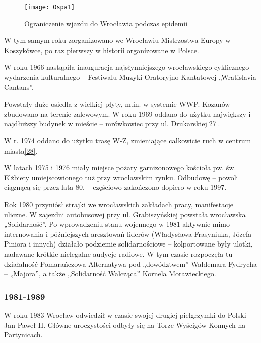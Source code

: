 \documentclass{article}
\begin{document}
\begin{figure}[h]
\centering

\texttt{[image: Ospa1]}
\caption{Ograniczenie wjazdu do Wrocławia podczas epidemii}
\label{rysunek18}
\end{figure}


\noindent W tym samym roku zorganizowano we Wrocławiu Mistrzostwa Europy w Koszykówce, po raz pierwszy w historii organizowane w Polsce.

\vspace{6pt}

\noindent W roku 1966 nastąpiła inauguracja najsłynniejszego wrocławskiego cyklicznego wydarzenia kulturalnego – Festiwalu Muzyki Oratoryjno-Kantatowej „Wratislavia Cantans”.

\vspace{6pt}

\noindent Powstały duże osiedla z wielkiej płyty, m.in. w systemie WWP. Kozanów zbudowano na terenie zalewowym. W roku 1969 oddano do użytku największy i najdłuższy budynek w mieście – mrówkowiec przy ul. Drukarskiej\hyperref[27]{[27]}\label{227}.

\vspace{6pt}

\noindent W r. 1974 oddano do użytku trasę W-Z, zmieniające całkowicie ruch w centrum miasta\hyperref[28]{[28]}\label{228}.

\vspace{6pt}

\noindent W latach 1975 i 1976 miały miejsce pożary garnizonowego kościoła pw. św. Elżbiety umiejscowionego tuż przy wrocławskim rynku. Odbudowę – powoli ciągnącą się przez lata 80. – częściowo zakończono dopiero w roku 1997.

\vspace{6pt}

\noindent Rok 1980 przyniósł strajki we wrocławskich zakładach pracy, manifestacje uliczne. W zajezdni autobusowej przy ul. Grabiszyńskiej powstała wrocławska „Solidarność”. Po wprowadzeniu stanu wojennego w 1981 aktywnie mimo internowania i późniejszych aresztowań liderów (Władysława Frasyniuka, Józefa Piniora i innych) działało podziemie solidarnościowe – kolportowane były ulotki, nadawane krótkie nielegalne audycje radiowe. W tym czasie rozpoczęła tu działalność Pomarańczowa Alternatywa pod „dowództwem” Waldemara Fydrycha – „Majora”, a także „Solidarność Walcząca” Kornela Morawieckiego.



\subsubsection*{1981-1989}
W roku 1983 Wrocław odwiedził w czasie swojej drugiej pielgrzymki do Polski Jan Paweł II. Główne uroczystości odbyły się na Torze Wyścigów Konnych na Partynicach.
\end{document}
